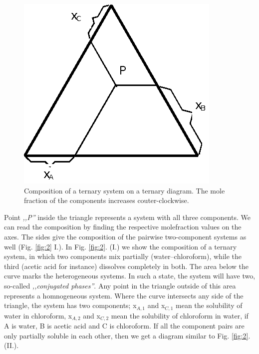 \begin{figure}[b!]
\centering
\includegraphics{fig/terner1.eps}
\caption{Composition of a ternary system on a ternary diagram. The mole fraction of the components increases couter-clockwise.}
\label{fig:1}
\end{figure}

Point \emph{,,P''} inside the triangle represents a system with all three components. We can read the composition by finding the respective molefraction values on the axes. The sides give the composition of the pairwise two-component systems as well (Fig. \ref{fig:2} I.). In Fig. \ref{fig:2}. (I.) we show the composition of a ternary system, in which two components mix partially (water--chloroform), while the third (acetic acid for instance) dissolves completely in both. The area below the curve marks the heterogeneous systems. In such a state, the system will have two, so-called \emph{,,conjugated phases''}. Any point in the triangle outside of this area represents a homnogeneous system. Where the curve intersects any side of the triangle, the system has two components; x$_{A,1}$ and x$_{C,1}$ mean the solubility of water in chloroform, x$_{A,2}$ and x$_{C,2}$ mean the solubility of chloroform in water, if A is water, B is acetic acid and C is chloroform. If all the component pairs are only partially soluble in each other, then we get a diagram similar to Fig. \ref{fig:2}. (II.).

